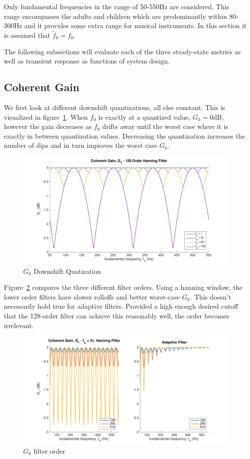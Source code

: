 \documentclass [11pt, proquest,oneside] {ganter_thesis}[2015/03/03]
\begin{document}
Only fundamental frequencies in the range of 50-550Hz are considered. This range encompasses the adults and children which are predominantly within 80-300Hz \cite{vandali2005pitch} and it provides some extra range for musical instruments.  In this section it is assumed that $\tilde{f}_0 = f_0$.

The following subsections will evaluate each of the three steady-state metrics as well as transient response as functions of system design.

\subsection{Coherent Gain}

We first look at different downshift quantizations, all else constant.  This is visualized in figure~\ref{fig:g_k_1}.  When $f_0$ is exactly at a quantized value, $G_k = 0$dB, however the gain decreases as $f_0$ drifts away until the worst case where it is exactly in between quantization values.  Decreasing the quantization increases the number of dips and in turn improves the worst case $G_k$.

\begin{figure}[!ht]
  \centering
    \includegraphics[width=1\textwidth]{g_k_1}   
    \caption{$G_k$ Downshift Quatization}\label{fig:g_k_1}
\end{figure}

Figure~\ref{fig:g_k_2} compares the three different filter orders.  Using a hanning window, the lower order filters have slower rolloffs and better worst-case $G_k$.  This doesn't necessarily hold true for adaptive filters.  Provided a high enough desired cutoff that the 128-order filter can achieve this reasonably well, the order becomes irrelevant.

\begin{figure}[!ht]
  \centering
    \includegraphics[width=.8\textwidth]{g_k_2}   
    \caption{$G_k$ filter order}\label{fig:g_k_2}
\end{figure}
\end{document}
